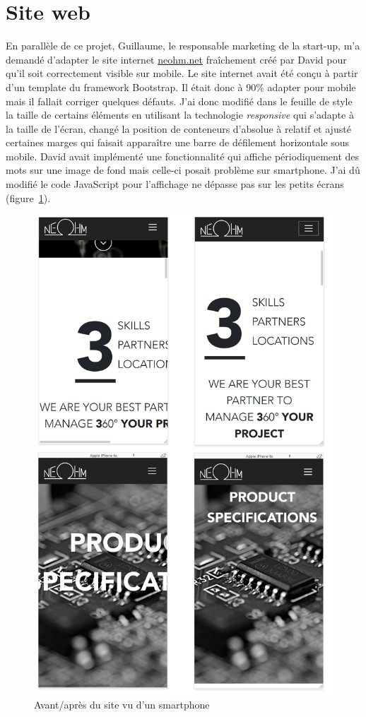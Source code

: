 \documentclass[a4paper, 12pt, sffamily]{report}
\begin{document}
\section{Site web}
En parallèle de ce projet, Guillaume, le responsable marketing de la start-up, m’a demandé d’adapter le site internet \url{neohm.net} fraîchement créé par David pour qu’il soit correctement visible sur mobile.
Le site internet avait été conçu à partir d’un template du framework Bootstrap. Il était donc à 90\% adapter pour mobile mais il fallait corriger quelques défauts. J'ai donc modifié dans le feuille de style la taille de certains éléments en utilisant la technologie \emph{responsive} qui s’adapte à la taille de l’écran, changé la position de conteneurs d’absolue à relatif et ajusté certaines marges qui faisait apparaître une barre de défilement horizontale sous mobile.
David avait implémenté une fonctionnalité qui affiche périodiquement des mots sur une image de fond mais celle-ci posait problème sur smartphone. J'ai dû modifié le code JavaScript pour l'affichage ne dépasse pas sur les petits écrans (figure~\ref{fig:website}).

\begin{figure}[H]
\centering
\includegraphics[scale=0.25]{figures/screenshots/website.png}
\caption{Avant/après du site vu d’un smartphone}
\label{fig:website}
\end{figure}
\end{document}
